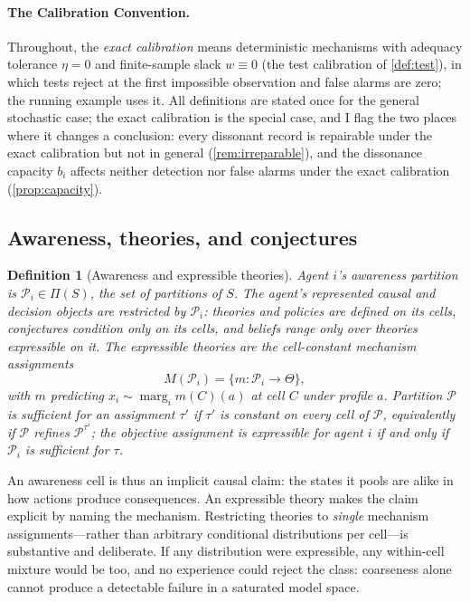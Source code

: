 \documentclass[11pt]{article}
\newtheorem{definition}[assumption]{Definition}
\theoremstyle{definition}
\newcommand{\marg}[1]{\operatorname{marg}_{#1}}
\begin{document}
\paragraph{The Calibration Convention.}
\label{conv:calibration}
Throughout, the \emph{exact calibration} means deterministic mechanisms with adequacy tolerance $\eta=0$ and finite-sample slack $w\equiv0$ (the test calibration of \cref{def:test}), in which tests reject at the first impossible observation and false alarms are zero; the running example uses it.
All definitions are stated once for the general stochastic case; the exact calibration is the special case, and I flag the two places where it changes a conclusion: every dissonant record is repairable under the exact calibration but not in general (\cref{rem:irreparable}), and the dissonance capacity $b_i$ affects neither detection nor false alarms under the exact calibration (\cref{prop:capacity}).

\subsection{Awareness, theories, and conjectures}
\label{sec:awareness-sub}

\begin{definition}[Awareness and expressible theories]
\label{def:awareness}
Agent $i$'s awareness partition is $\mathcal P_i\in\Pi(S)$, the set of partitions of $S$.
The agent's represented causal and decision objects are restricted by \(\mathcal P_i\): theories and policies are defined on its cells, conjectures condition only on its cells, and beliefs range only over theories expressible on it.
The \emph{expressible theories} are the cell-constant mechanism assignments
\begin{equation}
M(\mathcal P_i)=\{m:\mathcal P_i\to\Theta\},
\label{eq:expressible}
\end{equation}
with $m$ predicting $x_i\sim\marg{i}m(C)(a)$ at cell $C$ under profile $a$.
Partition $\mathcal P$ is \emph{sufficient} for an assignment $\tau'$ if $\tau'$ is constant on every cell of $\mathcal P$, equivalently if $\mathcal P$ refines $\mathcal P^{\tau'}$; the objective assignment is expressible for agent $i$ if and only if $\mathcal P_i$ is sufficient for $\tau$.
\end{definition}

An awareness cell is thus an implicit causal claim: the states it pools are alike in how actions produce consequences.
An expressible theory makes the claim explicit by naming the mechanism.
Restricting theories to \emph{single} mechanism assignments---rather than arbitrary conditional distributions per cell---is substantive and deliberate.
If any distribution were expressible, any within-cell mixture would be too, and no experience could reject the class: coarseness alone cannot produce a detectable failure in a saturated model space.
\end{document}
